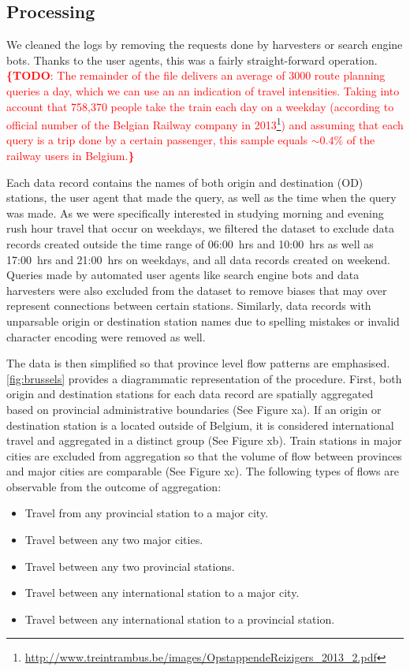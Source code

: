 \documentclass{sig-alternate}
\newcommand{\todo}[1]{\noindent\textcolor{red}{{\bf \{TODO}: #1{\bf \}}}}
\begin{document}
\subsection{Processing}

We cleaned the logs by removing the requests done by harvesters or search engine bots.
Thanks to the user agents, this was a fairly straight-forward operation.
\todo{The remainder of the file delivers an average of 3000 route planning queries a day, which we can use an an indication of travel intensities.
Taking into account that 758,370 people take the train each day on a weekday (according to official number of the Belgian Railway company in 2013\footnote{\url{http://www.treintrambus.be/images/OpstappendeReizigers_2013_2.pdf}}) and assuming that each query is a trip done by a certain passenger, this sample equals $\sim0.4\%$ of the railway users in Belgium.}

Each data record contains the names of both origin and destination (OD) stations, the user agent that made the query, as well as the time when the query was made.
As we were specifically interested in studying morning and evening rush hour travel that occur on weekdays, we filtered the dataset to exclude data records created outside the time range of 06:00~hrs and 10:00~hrs as well as 17:00~hrs and 21:00~hrs on weekdays, and all data records created on weekend. Queries made by automated user agents like search engine bots and data harvesters were also excluded from the dataset to remove biases that may over represent connections between certain stations. Similarly, data records with unparsable origin or destination station names due to spelling mistakes or invalid character encoding were removed as well.

The data is then simplified so that province level flow patterns are emphasised.
\cref{fig:brussels} provides a diagrammatic representation of the procedure.
First, both origin and destination stations for each data record are spatially aggregated based on provincial administrative boundaries (See Figure xa).
If an origin or destination station is a located outside of Belgium, it is considered international travel and aggregated in a distinct group (See Figure xb).
Train stations in major cities are excluded from aggregation so that the volume of flow between provinces and major cities are comparable (See Figure xc).
The following types of flows are observable from the outcome of aggregation:

\begin{itemize}
  \item Travel from any provincial station to a major city.
  \item Travel between any two major cities.
  \item Travel between any two provincial stations.
  \item Travel between any international station to a major city.
  \item Travel between any international station to a provincial station.
\end{itemize}
\end{document}
